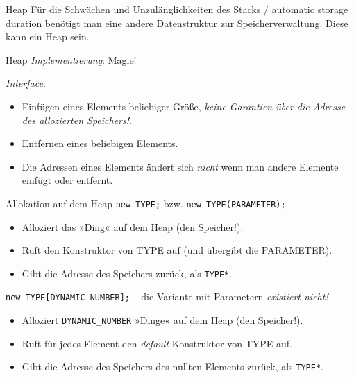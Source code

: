 \begin{frame}{Heap}
	Für die Schwächen und Unzulänglichkeiten des Stacks / automatic storage duration benötigt man eine andere Datenstruktur zur Speicherverwaltung.
	Diese kann ein Heap sein.
	
	\pause
	
	\begin{block}{Heap}
		\emph{Implementierung}: Magie!
		
		\pause
		
		\emph{Interface}:
		\begin{itemize}
			\item Einfügen eines Elements beliebiger Größe, \emph{keine Garantien über die Adresse des allozierten Speichers!}.
			\item Entfernen eines beliebigen Elements.
			\item Die Adressen eines Elements ändert sich \emph{nicht} wenn man andere Elemente einfügt oder entfernt.
		\end{itemize}
	\end{block}
\end{frame}

\begin{frame}[fragile]{Allokation auf dem Heap}
	\verb|new TYPE;| \hspace{1em} bzw. \hspace{1em} \verb|new TYPE(PARAMETER);|
	\begin{itemize}
		\item Alloziert das »Ding« auf dem Heap (den Speicher!).
		\item Ruft den Konstruktor von TYPE auf (und übergibt die PARAMETER).
		\item Gibt die Adresse des Speichers zurück, als \verb|TYPE*|.
	\end{itemize}
	
	\vspace{2em}
	
	\verb|new TYPE[DYNAMIC_NUMBER];| -- die Variante mit Parametern \emph{existiert nicht!}
	\begin{itemize}
		\item Alloziert \verb|DYNAMIC_NUMBER| »Dinge« auf dem Heap (den Speicher!).
		\item Ruft für jedes Element den \emph{default}-Konstruktor von TYPE auf.
		\item Gibt die Adresse des Speichers des nullten Elements zurück, als \verb|TYPE*|.
	\end{itemize}
\end{frame}

